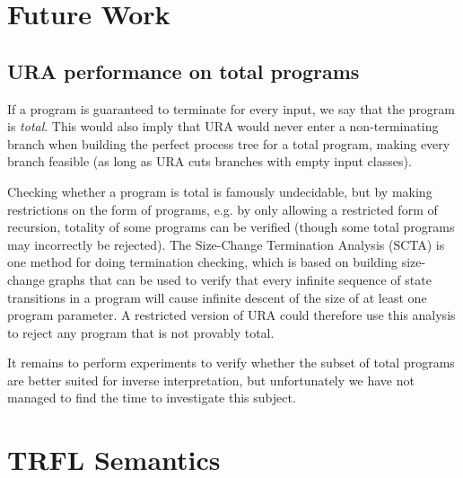 \documentclass[10pt]{../sigplanconf}
\begin{document}
\section{Future Work}
\subsection{URA performance on total programs}
If a program is guaranteed to terminate for every input, we say that
the program is \emph{total}. This would also imply that URA would
never enter a non-terminating branch when building the perfect process
tree for a total program, making every branch feasible (as long as URA
cuts branches with empty input classes).

Checking whether a program is total is famously undecidable, but by
making restrictions on the form of programs, e.g. by only allowing a
restricted form of recursion, totality of some programs can be
verified (though some total programs may incorrectly be rejected). The
Size-Change Termination Analysis (SCTA)\cite{lee2001size} is one
method for doing termination checking, which is based on building
size-change graphs that can be used to verify that every infinite
sequence of state transitions in a program will cause infinite descent
of the size of at least one program parameter. A restricted version of
URA could therefore use this analysis to reject any program that is
not provably total.

It remains to perform experiments to verify whether the subset of
total programs are better suited for inverse interpretation, but
unfortunately we have not managed to find the time to investigate this
subject.





\appendix
\section{TRFL Semantics}
\label{sec:semantics}
\end{document}
